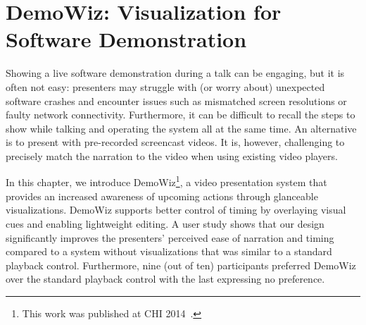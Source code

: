 \chapter{DemoWiz: Visualization for Software Demonstration}
\label{chapter_demowiz}

Showing a live software demonstration during a talk can be engaging, but it is often not easy: presenters may struggle with (or worry about) unexpected software crashes and encounter issues such as mismatched screen resolutions or faulty network connectivity. Furthermore, it can be difficult to recall the steps to show while talking and operating the system all at the same time. An alternative is to present with pre-recorded screencast videos. It is, however, challenging to precisely match the narration to the video when using existing video players.

In this chapter, we introduce DemoWiz\footnote{This work was published at CHI 2014~\cite{Chi:2014:DRS:2556288.2557254}.}, a video presentation system that provides an increased awareness of upcoming actions through glanceable visualizations. DemoWiz supports better control of timing by overlaying visual cues and enabling lightweight editing. A user study shows that our design significantly improves the presenters' perceived ease of narration and timing compared to a system without visualizations that was similar to a standard playback control. Furthermore, nine (out of ten) participants preferred DemoWiz over the standard playback control with the last expressing no preference.








